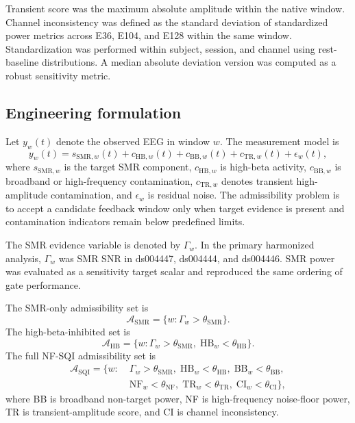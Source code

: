 \documentclass[preprint,12pt]{elsarticle}
\begin{document}
Transient score was the maximum absolute amplitude within the native window. Channel inconsistency was defined as the standard deviation of standardized power metrics across E36, E104, and E128 within the same window. Standardization was performed within subject, session, and channel using rest-baseline distributions. A median absolute deviation version was computed as a robust sensitivity metric.

\subsection{Engineering formulation}

Let \(y_w(t)\) denote the observed EEG in window \(w\). The measurement model is
\begin{equation}
    y_w(t) = s_{\mathrm{SMR},w}(t) + c_{\mathrm{HB},w}(t) + c_{\mathrm{BB},w}(t) + c_{\mathrm{TR},w}(t) + \epsilon_w(t),
\end{equation}
where \(s_{\mathrm{SMR},w}\) is the target SMR component, \(c_{\mathrm{HB},w}\) is high-beta activity, \(c_{\mathrm{BB},w}\) is broadband or high-frequency contamination, \(c_{\mathrm{TR},w}\) denotes transient high-amplitude contamination, and \(\epsilon_w\) is residual noise. The admissibility problem is to accept a candidate feedback window only when target evidence is present and contamination indicators remain below predefined limits.

The SMR evidence variable is denoted by \(\Gamma_w\). In the primary harmonized analysis, \(\Gamma_w\) was SMR SNR in ds004447, ds004444, and ds004446. SMR power was evaluated as a sensitivity target scalar and reproduced the same ordering of gate performance.

The SMR-only admissibility set is
\begin{equation}
    \mathcal{A}_{\mathrm{SMR}} = \{w: \Gamma_w > \theta_{\mathrm{SMR}}\}.
\end{equation}
The high-beta-inhibited set is
\begin{equation}
    \mathcal{A}_{\mathrm{HB}} = \{w: \Gamma_w > \theta_{\mathrm{SMR}},\; \mathrm{HB}_w < \theta_{\mathrm{HB}}\}.
\end{equation}
The full NF-SQI admissibility set is
\begin{equation}
\begin{split}
    \mathcal{A}_{\mathrm{SQI}} = \{w: &\; \Gamma_w > \theta_{\mathrm{SMR}},\; \mathrm{HB}_w < \theta_{\mathrm{HB}},\; \mathrm{BB}_w < \theta_{\mathrm{BB}}, \\
    &\; \mathrm{NF}_w < \theta_{\mathrm{NF}},\; \mathrm{TR}_w < \theta_{\mathrm{TR}},\; \mathrm{CI}_w < \theta_{\mathrm{CI}}\},
\end{split}
\end{equation}
where BB is broadband non-target power, NF is high-frequency noise-floor power, TR is transient-amplitude score, and CI is channel inconsistency.
\end{document}
